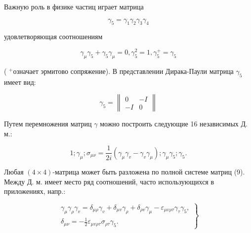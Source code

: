 \documentclass[10pt]{article}
\begin{document}
Важную роль в физике частиц играет матрица



\[

\gamma_{5}=\gamma_{1} \gamma_{2} \gamma_{3} \gamma_{4}

\]



удовлетворяющая соотношениям



\[

\gamma_{\mu} \gamma_{5}+\gamma_{5} \gamma_{\mu}=0, \gamma_{5}^{2}=1, \gamma_{5}^{+}=\gamma_{5}

\]



( ${ }^{+}$означает эрмитово сопряжение). В представлении Дирака-Паули матрица $\gamma_{5}$ имеет вид:



\[

\gamma_{5}=\left\|\begin{array}{rr}

0 & -I \\

-I & 0

\end{array}\right\|

\]



Путем перемножения матриц $\gamma$ можно построить следующие 16 независимых Д. м.:



\[

1 ; \gamma_{\mu} ; \sigma_{\mu \nu}=\frac{1}{2 i}\left(\gamma_{\mu} \gamma_{v}-\gamma_{v} \gamma_{\mu}\right) ; \gamma_{\mu} \gamma_{5} ; \gamma_{5} .

\]



Любая $(4 \times 4)$-матрица может быть разложена по полной системе матриц (9). Между Д. м. имеет место ряд соотношений, часто использующихся в приложениях, напр.:



\[

\left.\begin{array}{c}

\gamma_{\mu} \gamma_{\rho} \gamma_{v}=\delta_{\mu \rho} \gamma_{v}+\delta_{\mu v} \gamma_{\rho}+\delta_{\rho v} \gamma_{\mu}-\varepsilon_{\mu v \rho \tau} \gamma_{\tau} \gamma_{5}, \\

\delta_{\mu \nu}=-\frac{1}{2} \varepsilon_{\mu v \rho \tau} \sigma_{\rho \tau} \gamma_{5} .

\end{array}\right\}

\]
\end{document}
